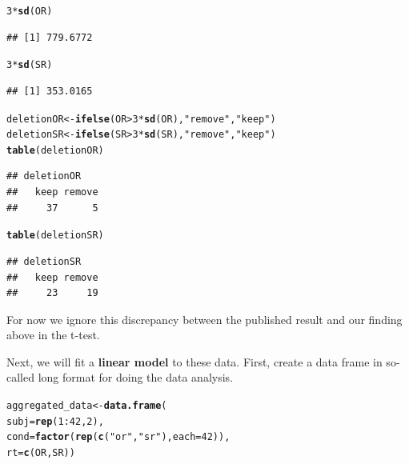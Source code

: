 \documentclass[12pt]{book}\usepackage[]{graphicx}\usepackage[]{color}
\makeatletter
\newcommand{\hlnum}[1]{\textcolor[rgb]{0.686,0.059,0.569}{#1}}%
\newcommand{\hlstr}[1]{\textcolor[rgb]{0.192,0.494,0.8}{#1}}%
\newcommand{\hlopt}[1]{\textcolor[rgb]{0,0,0}{#1}}%
\newcommand{\hlstd}[1]{\textcolor[rgb]{0.345,0.345,0.345}{#1}}%
\newcommand{\hlkwb}[1]{\textcolor[rgb]{0.69,0.353,0.396}{#1}}%
\newcommand{\hlkwc}[1]{\textcolor[rgb]{0.333,0.667,0.333}{#1}}%
\newcommand{\hlkwd}[1]{\textcolor[rgb]{0.737,0.353,0.396}{\textbf{#1}}}%
\newenvironment{kframe}{%
 \def\at@end@of@kframe{}%
 \ifinner\ifhmode%
  \def\at@end@of@kframe{\end{minipage}}%
  \begin{minipage}{\columnwidth}%
 \fi\fi%
 \def\FrameCommand##1{\hskip\@totalleftmargin \hskip-\fboxsep
 \colorbox{shadecolor}{##1}\hskip-\fboxsep
     \hskip-\linewidth \hskip-\@totalleftmargin \hskip\columnwidth}%
 \MakeFramed {\advance\hsize-\width
   \@totalleftmargin\z@ \linewidth\hsize
   \@setminipage}}%
 {\par\unskip\endMakeFramed%
 \at@end@of@kframe}
\newenvironment{knitrout}{}{} %
\makeatother
\begin{document}
\begin{knitrout}
\color{fgcolor}\begin{kframe}
\begin{alltt}
\hlnum{3}\hlopt{*}\hlkwd{sd}\hlstd{(OR)}
\end{alltt}
\begin{verbatim}
## [1] 779.6772
\end{verbatim}
\begin{alltt}
\hlnum{3}\hlopt{*}\hlkwd{sd}\hlstd{(SR)}
\end{alltt}
\begin{verbatim}
## [1] 353.0165
\end{verbatim}
\begin{alltt}
\hlstd{deletionOR}\hlkwb{<-}\hlkwd{ifelse}\hlstd{(OR}\hlopt{>}\hlnum{3}\hlopt{*}\hlkwd{sd}\hlstd{(OR),}\hlstr{"remove"}\hlstd{,}\hlstr{"keep"}\hlstd{)}
\hlstd{deletionSR}\hlkwb{<-}\hlkwd{ifelse}\hlstd{(SR}\hlopt{>}\hlnum{3}\hlopt{*}\hlkwd{sd}\hlstd{(SR),}\hlstr{"remove"}\hlstd{,}\hlstr{"keep"}\hlstd{)}
\hlkwd{table}\hlstd{(deletionOR)}
\end{alltt}
\begin{verbatim}
## deletionOR
##   keep remove 
##     37      5
\end{verbatim}
\begin{alltt}
\hlkwd{table}\hlstd{(deletionSR)}
\end{alltt}
\begin{verbatim}
## deletionSR
##   keep remove 
##     23     19
\end{verbatim}
\end{kframe}
\end{knitrout}

For now we ignore this discrepancy between the published result and our finding above in the t-test.

Next, we will fit a \textbf{linear model} to these data. First, create a data frame in so-called long format for doing the data analysis.

\begin{knitrout}
\color{fgcolor}\begin{kframe}
\begin{alltt}
\hlstd{aggregated_data}\hlkwb{<-}\hlkwd{data.frame}\hlstd{(}
  \hlkwc{subj}\hlstd{=}\hlkwd{rep}\hlstd{(}\hlnum{1}\hlopt{:}\hlnum{42}\hlstd{,}\hlnum{2}\hlstd{),}
  \hlkwc{cond}\hlstd{=}\hlkwd{factor}\hlstd{(}\hlkwd{rep}\hlstd{(}\hlkwd{c}\hlstd{(}\hlstr{"or"}\hlstd{,}\hlstr{"sr"}\hlstd{),}\hlkwc{each}\hlstd{=}\hlnum{42}\hlstd{)),}
              \hlkwc{rt}\hlstd{=}\hlkwd{c}\hlstd{(OR,SR))}
\end{alltt}
\end{kframe}
\end{knitrout}
\end{document}
